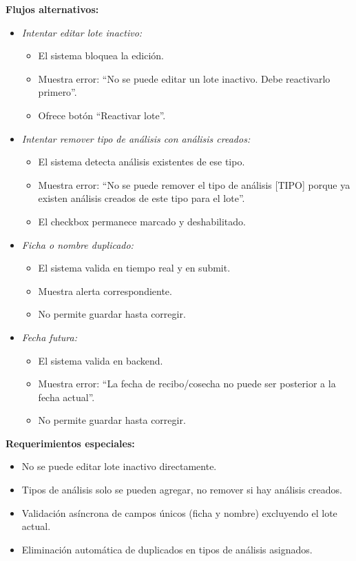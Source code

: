 \vspace{0.5em}
\noindent\textbf{Flujos alternativos:}
\begin{itemize}[nosep]
    \item \textit{Intentar editar lote inactivo:}
    \begin{itemize}[nosep]
        \item El sistema bloquea la edición.
        \item Muestra error: ``No se puede editar un lote inactivo. Debe reactivarlo primero''.
        \item Ofrece botón ``Reactivar lote''.
    \end{itemize}
    \item \textit{Intentar remover tipo de análisis con análisis creados:}
    \begin{itemize}[nosep]
        \item El sistema detecta análisis existentes de ese tipo.
        \item Muestra error: ``No se puede remover el tipo de análisis [TIPO] porque ya existen análisis creados de este tipo para el lote''.
        \item El checkbox permanece marcado y deshabilitado.
    \end{itemize}
    \item \textit{Ficha o nombre duplicado:}
    \begin{itemize}[nosep]
        \item El sistema valida en tiempo real y en submit.
        \item Muestra alerta correspondiente.
        \item No permite guardar hasta corregir.
    \end{itemize}
    \item \textit{Fecha futura:}
    \begin{itemize}[nosep]
        \item El sistema valida en backend.
        \item Muestra error: ``La fecha de recibo/cosecha no puede ser posterior a la fecha actual''.
        \item No permite guardar hasta corregir.
    \end{itemize}
\end{itemize}

\vspace{0.5em}
\noindent\textbf{Requerimientos especiales:}
\begin{itemize}[nosep]
    \item No se puede editar lote inactivo directamente.
    \item Tipos de análisis solo se pueden agregar, no remover si hay análisis creados.
    \item Validación asíncrona de campos únicos (ficha y nombre) excluyendo el lote actual.
    \item Eliminación automática de duplicados en tipos de análisis asignados.
\end{itemize}
